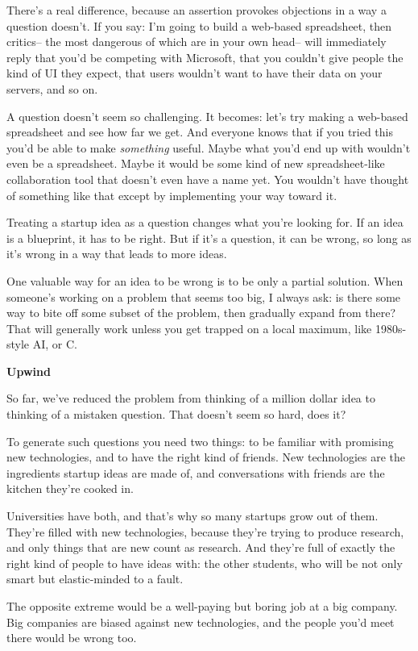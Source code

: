There's a real difference, because an assertion provokes objections in a
way a question doesn't. If you say: I'm going to build a web-based
spreadsheet, then critics-- the most dangerous of which are in your own
head-- will immediately reply that you'd be competing with Microsoft,
that you couldn't give people the kind of UI they expect, that users
wouldn't want to have their data on your servers, and so on.

A question doesn't seem so challenging. It becomes: let's try making a
web-based spreadsheet and see how far we get. And everyone knows that if
you tried this you'd be able to make \emph{something} useful. Maybe what
you'd end up with wouldn't even be a spreadsheet. Maybe it would be some
kind of new spreadsheet-like collaboration tool that doesn't even have a
name yet. You wouldn't have thought of something like that except by
implementing your way toward it.

Treating a startup idea as a question changes what you're looking for.
If an idea is a blueprint, it has to be right. But if it's a question,
it can be wrong, so long as it's wrong in a way that leads to more
ideas.

One valuable way for an idea to be wrong is to be only a partial
solution. When someone's working on a problem that seems too big, I
always ask: is there some way to bite off some subset of the problem,
then gradually expand from there? That will generally work unless you
get trapped on a local maximum, like 1980s-style AI, or C.

\textbf{Upwind}

So far, we've reduced the problem from thinking of a million dollar idea
to thinking of a mistaken question. That doesn't seem so hard, does it?

To generate such questions you need two things: to be familiar with
promising new technologies, and to have the right kind of friends. New
technologies are the ingredients startup ideas are made of, and
conversations with friends are the kitchen they're cooked in.

Universities have both, and that's why so many startups grow out of
them. They're filled with new technologies, because they're trying to
produce research, and only things that are new count as research. And
they're full of exactly the right kind of people to have ideas with: the
other students, who will be not only smart but elastic-minded to a
fault.

The opposite extreme would be a well-paying but boring job at a big
company. Big companies are biased against new technologies, and the
people you'd meet there would be wrong too.

